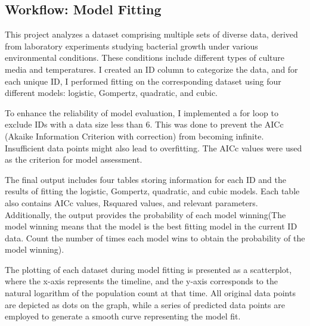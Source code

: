 \documentclass[11pt]{article}
\begin{document}
\subsection{Workflow: Model Fitting}
This project analyzes a dataset comprising multiple sets of diverse data, derived from laboratory experiments studying bacterial growth under various environmental conditions. These conditions include different types of culture media and temperatures. I created an ID column to categorize the data, and for each unique ID, I performed fitting on the corresponding dataset using four different models: logistic, Gompertz, quadratic, and cubic.\par
To enhance the reliability of model evaluation, I implemented a for loop to exclude IDs with a data size less than 6. This was done to prevent the AICc (Akaike Information Criterion with correction) from becoming infinite. Insufficient data points might also lead to overfitting. The AICc values were used as the criterion for model assessment.\par
The final output includes four tables storing information for each ID and the results of fitting the logistic, Gompertz, quadratic, and cubic models. Each table also contains AICc values, Rsquared values, and relevant parameters. Additionally, the output provides the probability of each model winning(The model winning means that the model is the best fitting model in the current ID data. Count the number of times each model wins to obtain the probability of the model winning).\par
The plotting of each dataset during model fitting is presented as a scatterplot, where the x-axis represents the timeline, and the y-axis corresponds to the natural logarithm of the population count at that time. All original data points are depicted as dots on the graph, while a series of predicted data points are employed to generate a smooth curve representing the model fit.
\end{document}
